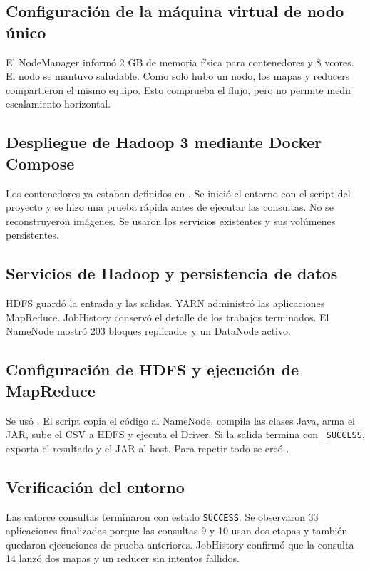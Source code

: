 \documentclass[10pt,a4paper]{article}
\theoremstyle{definition}
\begin{document}
\subsection{Configuración de la máquina virtual de nodo único}
El NodeManager informó 2 GB de memoria física para contenedores y 8 vcores. El
nodo se mantuvo saludable. Como solo hubo un nodo, los mapas y reducers
compartieron el mismo equipo. Esto comprueba el flujo, pero no permite medir
escalamiento horizontal.

\subsection{Despliegue de Hadoop 3 mediante Docker Compose}
Los contenedores ya estaban definidos en . Se inició
el entorno con el script del proyecto y se hizo una prueba rápida antes de
ejecutar las consultas. No se reconstruyeron imágenes. Se usaron los servicios
existentes y sus volúmenes persistentes.

\subsection{Servicios de Hadoop y persistencia de datos}
HDFS guardó la entrada y las salidas. YARN administró las aplicaciones
MapReduce. JobHistory conservó el detalle de los trabajos terminados. El
NameNode mostró 203 bloques replicados y un DataNode activo.

\subsection{Configuración de HDFS y ejecución de MapReduce}
Se usó . El script copia el código al
NameNode, compila las clases Java, arma el JAR, sube el CSV a HDFS y ejecuta el
Driver. Si la salida termina con \texttt{\_SUCCESS}, exporta el resultado y el
JAR al host. Para repetir todo se creó
.

\subsection{Verificación del entorno}
Las catorce consultas terminaron con estado \texttt{SUCCESS}. Se observaron 33
aplicaciones finalizadas porque las consultas 9 y 10 usan dos etapas y también
quedaron ejecuciones de prueba anteriores. JobHistory confirmó que la consulta
14 lanzó dos mapas y un reducer sin intentos fallidos.
\end{document}
